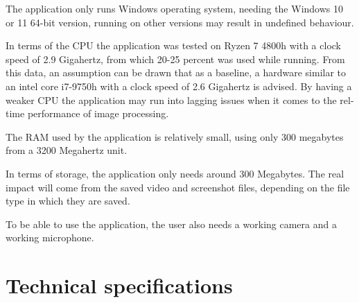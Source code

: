 \par The application only runs Windows operating system, needing the Windows 10 or 11 64-bit version, running on other versions may result in undefined behaviour.
\par In terms of the CPU the application was tested on Ryzen 7 4800h with a clock speed of 2.9 Gigahertz, from which 20-25 percent was used while running. From this data, an assumption can be drawn that as a baseline, a hardware similar to an intel core i7-9750h with a clock speed of 2.6 Gigahertz is advised. By having a weaker CPU the application may run into lagging issues when it comes to the rel-time performance of image processing.
\par The RAM used by the application is relatively small, using only 300 megabytes from a 3200 Megahertz unit.
\par In terms of storage, the application only needs around 300 Megabytes. The real impact will come from the saved video and screenshot files, depending on the file type in which they are saved.
\par To be able to use the application, the user also needs a working camera and a working microphone.

\label{sec:specssec2}

\section{Technical specifications}
\label{sec:specssec2}

